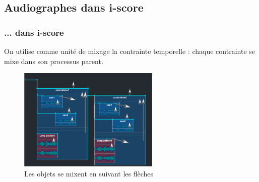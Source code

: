 \documentclass[draft]{beamer}
\begin{document}
\subsection{Audiographes dans i-score}
\begin{frame}
	\frametitle{... dans i-score}    
	\Large
	
    On utilise comme unité de mixage la contrainte temporelle : 
    chaque contrainte se mixe dans son processus parent.
	
	\begin{figure}
		\centering
		\includegraphics[width=0.6\textwidth]{images/mixage.png}
		\caption{Les objets se mixent en suivant les flèches}
	\end{figure}
\end{frame}
\end{document}
